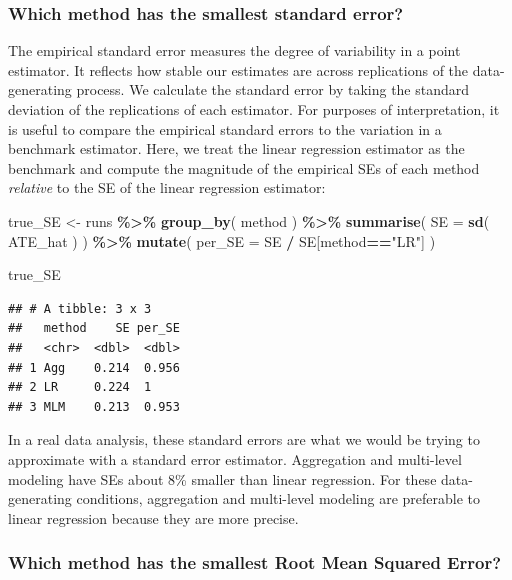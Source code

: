 \documentclass[
]{book}
\newenvironment{Shaded}{\begin{snugshade}}{\end{snugshade}}
\newcommand{\AttributeTok}[1]{\textcolor[rgb]{0.13,0.29,0.53}{#1}}
\newcommand{\FunctionTok}[1]{\textcolor[rgb]{0.13,0.29,0.53}{\textbf{#1}}}
\newcommand{\NormalTok}[1]{#1}
\newcommand{\OtherTok}[1]{\textcolor[rgb]{0.56,0.35,0.01}{#1}}
\newcommand{\SpecialCharTok}[1]{\textcolor[rgb]{0.81,0.36,0.00}{\textbf{#1}}}
\newcommand{\StringTok}[1]{\textcolor[rgb]{0.31,0.60,0.02}{#1}}
\begin{document}
\subsubsection*{Which method has the smallest standard error?}\label{which-method-has-the-smallest-standard-error}

The empirical standard error measures the degree of variability in a point estimator.
It reflects how stable our estimates are across replications of the data-generating process.
We calculate the standard error by taking the standard deviation of the replications of each estimator.
For purposes of interpretation, it is useful to compare the empirical standard errors to the variation in a benchmark estimator.
Here, we treat the linear regression estimator as the benchmark and compute the magnitude of the empirical SEs of each method \emph{relative} to the SE of the linear regression estimator:

\begin{Shaded}
\begin{Highlighting}[]
\NormalTok{true\_SE }\OtherTok{\textless{}{-}} 
\NormalTok{  runs }\SpecialCharTok{\%\textgreater{}\%} 
  \FunctionTok{group\_by}\NormalTok{( method ) }\SpecialCharTok{\%\textgreater{}\%}
  \FunctionTok{summarise}\NormalTok{( }\AttributeTok{SE =} \FunctionTok{sd}\NormalTok{( ATE\_hat ) ) }\SpecialCharTok{\%\textgreater{}\%}
  \FunctionTok{mutate}\NormalTok{( }\AttributeTok{per\_SE =}\NormalTok{ SE }\SpecialCharTok{/}\NormalTok{ SE[method}\SpecialCharTok{==}\StringTok{"LR"}\NormalTok{] )}

\NormalTok{true\_SE}
\end{Highlighting}
\end{Shaded}

\begin{verbatim}
## # A tibble: 3 x 3
##   method    SE per_SE
##   <chr>  <dbl>  <dbl>
## 1 Agg    0.214  0.956
## 2 LR     0.224  1    
## 3 MLM    0.213  0.953
\end{verbatim}

In a real data analysis, these standard errors are what we would be trying to approximate with a standard error estimator.
Aggregation and multi-level modeling have SEs about 8\% smaller than linear regression.
For these data-generating conditions, aggregation and multi-level modeling are preferable to linear regression because they are more precise.

\subsubsection*{Which method has the smallest Root Mean Squared Error?}\label{which-method-has-the-smallest-root-mean-squared-error}
\end{document}
